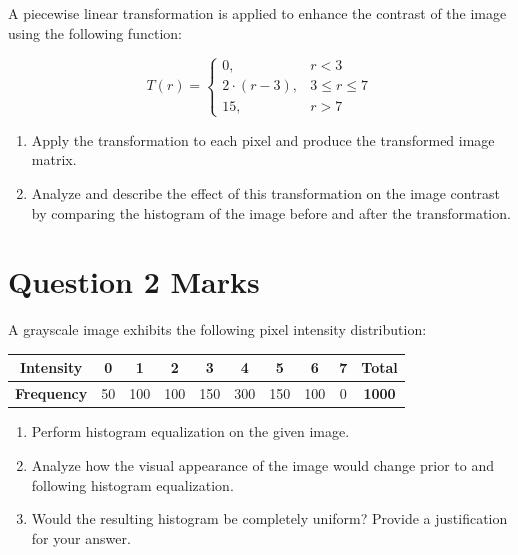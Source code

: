\documentclass[12pt,a4paper]{article}
\begin{document}
A piecewise linear transformation is applied to enhance the contrast of the image using the following function:

\begin{equation*}
T(r) = \begin{cases}
0, & r < 3 \\
2 \cdot (r - 3), & 3 \le r \le 7 \\
15, & r > 7
\end{cases}
\end{equation*}

\begin{enumerate}
\item[(a)] Apply the transformation to each pixel and produce the transformed image matrix.
\item[(b)] Analyze and describe the effect of this transformation on the image contrast by comparing the histogram of the image before and after the transformation.
\end{enumerate}

\vspace{1.0cm}
\section*{Question 2 \quad [CLO1-PL01-C4]  Marks}

A grayscale image exhibits the following pixel intensity distribution:

\begin{center}
\begin{tabular}{|c|c|c|c|c|c|c|c|c|c|}
\hline
\textbf{Intensity} & 0 & 1 & 2 & 3 & 4 & 5 & 6 & 7 & \textbf{Total} \\
\hline
\textbf{Frequency} & 50 & 100 & 100 & 150 & 300 & 150 & 100 & 0 & \textbf{1000} \\
\hline
\end{tabular}
\end{center}

\begin{enumerate}
\item[(a)] Perform histogram equalization on the given image.
\item[(b)] Analyze how the visual appearance of the image would change prior to and following histogram equalization.
\item[(c)] Would the resulting histogram be completely uniform? Provide a justification for your answer.
\end{enumerate}

\vspace{1.0cm}
\end{document}
